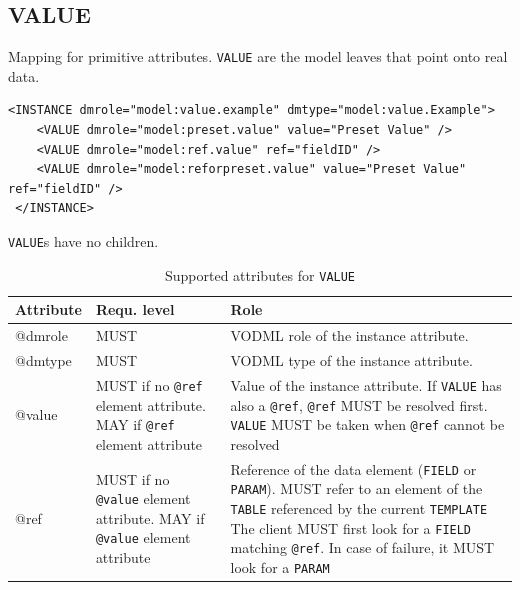 \documentclass[11pt,a4paper]{ivoa}
\begin{document}
\subsection{VALUE}

Mapping for primitive attributes. \texttt{VALUE}  are the model leaves that point onto real data. 


\begin{lstlisting}[caption={VALUE examples},captionpos=b]
<INSTANCE dmrole="model:value.example" dmtype="model:value.Example">
    <VALUE dmrole="model:preset.value" value="Preset Value" />    
    <VALUE dmrole="model:ref.value" ref="fieldID" />    
    <VALUE dmrole="model:reforpreset.value" value="Preset Value" ref="fieldID" />
 </INSTANCE>
\end{lstlisting}

 \texttt{VALUE}s have no children. 

\begin{table}[ht!]
     \begin{tabular}{|p{1.5cm}|p{4cm}|p{7cm}|}
       \hline Attribute & Requ. level & Role\\
       \hline  
      @dmrole   & MUST & VODML role of the instance attribute.\\       
       \hline 
      @dmtype   & MUST & VODML type of the instance attribute.\\
       \hline  
      @value  & MUST if no \texttt{@ref } element attribute. \newline MAY if \texttt{@ref} element attribute 
                    & Value of the instance attribute. 
                     \newline If  \texttt{VALUE} has also a \texttt{@ref}, \texttt{@ref} MUST be resolved first.
                     \texttt{VALUE}  MUST be taken when \texttt{@ref} cannot be resolved \\
        \hline
       @ref  & MUST if no \texttt{@value} element attribute. 
                     \newline MAY if \texttt{@value} element attribute 
                & Reference of the data element (\texttt{FIELD} or \texttt{PARAM}).  
                    \newline MUST refer to an element of the \texttt{TABLE}  referenced by the current     
                    \texttt{TEMPLATE}                    
                    \newline The client MUST first look for a \texttt{FIELD} matching \texttt{@ref}. 
                    \newline In case of failure, it MUST look for a \texttt{PARAM}
                    \\
       \hline 
     \end{tabular}
     \caption{Supported attributes for  \texttt{VALUE}} 
 \end{table}
\end{document}
